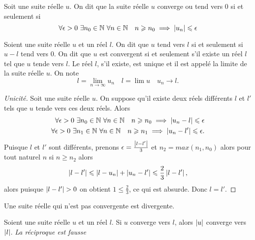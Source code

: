 \begin{defdef}
  Soit une suite réelle \(u\). On dit que la suite réelle \(u\) converge ou tend vers \(0\) si et seulement si
  \begin{equation}
    \forall \epsilon >0 \ \exists n_0\in \N \ \forall n \in \N \quad n\geqslant n_0 \implies \abs{u_n}\leqslant \epsilon
  \end{equation}
\end{defdef}
\begin{defdef}
  Soient une suite réelle \(u\) et un réel \(l\). On dit que \(u\) tend vers \(l\) si et seulement si \(u-l\) tend vers 0. On dit que \(u\) est convergent si et seulement s'il existe un réel \(l\) tel que \(u\) tende vers \(l\). Le réel \(l\), s'il existe, est unique et il est appelé la limite de la suite réelle \(u\). On note
  \begin{equation}
    l=\lim\limits_{n\to\infty} u_n \quad l=\lim u \quad u_n \rightarrow l.
  \end{equation}
\end{defdef}
\begin{proof}[Unicité]
  Soit une suite réelle \(u\). On suppose qu'il existe deux réels différents \(l\) et \(l'\) tels que \(u\) tende vers ces deux réels. Alors
  \begin{align}
    \forall \epsilon >0 \ \exists n_0\in \mathbb{N} \ \forall n\in\mathbb{N} \quad n\geqslant n_0 \implies \left\lvert u_n-l\right\rvert\leqslant \epsilon \\ 
    \forall \epsilon >0 \ \exists n_1\in \mathbb{N} \ \forall n\in\mathbb{N} \quad n\geqslant n_1 \implies \left\lvert u_n-l'\right\rvert\leqslant \epsilon.
  \end{align}
  Puisque \(l\) et \(l'\) sont différents, prenons \(\epsilon=\frac{\left\lvert l-l'\right\rvert}{3}\) et \(n_2=max(n_1,n_0)\) alors pour tout naturel \(n\) si \(n\geqslant n_2\) alors
\begin{equation}
  \left\lvert l-l'\right\rvert\leqslant \left\lvert l-u_n\right\rvert+\left\lvert u_n-l'\right\rvert\leqslant \frac{2}{3} \left\lvert l-l'\right\rvert,
\end{equation}
alors puisque \(\left\lvert l-l'\right\rvert>0\) on obtient \(1\leqslant \frac{2}{3}\), ce qui est absurde. Donc \(l=l'\).
\end{proof}
\begin{defdef}
  Une suite réelle qui n'est pas convergente est divergente.
\end{defdef}
\begin{prop}
  Soient une suite réelle \(u\) et un réel \(l\). Si \(u\) converge vers \(l\), alors \(\left\lvert u\right\rvert\) converge vers \(\left\lvert l\right\rvert\). \emph{La réciproque est fausse}
\end{prop}
